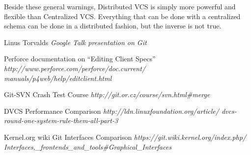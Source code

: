 \documentclass[a4paper,10pt]{article}
\begin{document}
Beside these general warnings, Distributed VCS is simply more powerful and flexible than Centralized VCS.
Everything that can be done with a centralized schema can be done in a distributed fashion, but the inverse
is not true. 


\begin{thebibliography}{9}

Linus Torvalds \emph{Google Talk presentation on Git}

Perforce documentation on ``Editing Client Specs''
\emph{
http://www.perforce.com/perforce/doc.current/
manuals/p4web/help/editclient.html
}

Git-SVN Crash Test Course
\emph{http://git.or.cz/course/svn.html\#merge}

DVCS Performance Comparison
\emph{http://ldn.linuxfoundation.org/article/
dvcs-round-one-system-rule-them-all-part-3}

Kernel.org wiki Git Interfaces Comparison
\emph{https://git.wiki.kernel.org/index.php/
Interfaces,\_frontends\_and\_tools\#Graphical\_Interfaces}

% 
% 
% 
% 
\end{thebibliography}
\end{document}

